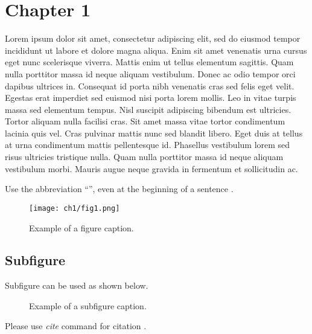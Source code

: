 \chapter{Chapter 1}
\label{chap:ch1}
Lorem ipsum dolor sit amet, consectetur adipiscing elit, sed do eiusmod tempor incididunt ut labore et dolore magna aliqua.
Enim sit amet venenatis urna cursus eget nunc scelerisque viverra.
Mattis enim ut tellus elementum sagittis.
Quam nulla porttitor massa id neque aliquam vestibulum.
Donec ac odio tempor orci dapibus ultrices in.
Consequat id porta nibh venenatis cras sed felis eget velit.
Egestas erat imperdiet sed euismod nisi porta lorem mollis.
Leo in vitae turpis massa sed elementum tempus.
Nisl suscipit adipiscing bibendum est ultricies.
Tortor aliquam nulla facilisi cras. Sit amet massa vitae tortor condimentum lacinia quis vel.
Cras pulvinar mattis nunc sed blandit libero.
Eget duis at tellus at urna condimentum mattis pellentesque id.
Phasellus vestibulum lorem sed risus ultricies tristique nulla.
Quam nulla porttitor massa id neque aliquam vestibulum morbi.
Mauris augue neque gravida in fermentum et sollicitudin ac.


Use the abbreviation ``'', even at the beginning of a sentence \cite{smit54}.

\begin{figure}
 \centering
 \texttt{[image: ch1/fig1.png]}
 \caption{Example of a figure caption.}
\end{figure}


\section{Subfigure}
Subfigure can be used as shown below.

\begin{figure}
 \centering
 \caption{Example of a subfigure caption.}
\end{figure}

Please use \textit{cite} command for citation \cite{colu92}.
